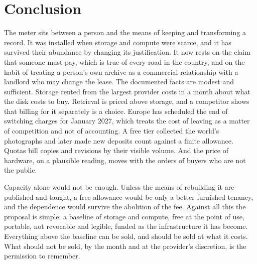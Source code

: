 \documentclass[11pt]{article}
\begin{document}
\section{Conclusion}

The meter sits between a person and the means of keeping and transforming a record. It was installed when storage and compute were scarce, and it has survived their abundance by changing its justification. It now rests on the claim that someone must pay, which is true of every road in the country, and on the habit of treating a person's own archive as a commercial relationship with a landlord who may change the lease. The documented facts are modest and sufficient. Storage rented from the largest provider costs in a month about what the disk costs to buy. Retrieval is priced above storage, and a competitor shows that billing for it separately is a choice. Europe has scheduled the end of switching charges for January 2027, which treats the cost of leaving as a matter of competition and not of accounting. A free tier collected the world's photographs and later made new deposits count against a finite allowance. Quotas bill copies and revisions by their visible volume. And the price of hardware, on a plausible reading, moves with the orders of buyers who are not the public.

Capacity alone would not be enough. Unless the means of rebuilding it are published and taught, a free allowance would be only a better-furnished tenancy, and the dependence would survive the abolition of the fee. Against all this the proposal is simple: a baseline of storage and compute, free at the point of use, portable, not revocable and legible, funded as the infrastructure it has become. Everything above the baseline can be sold, and should be sold at what it costs. What should not be sold, by the month and at the provider's discretion, is the permission to remember.
\end{document}
